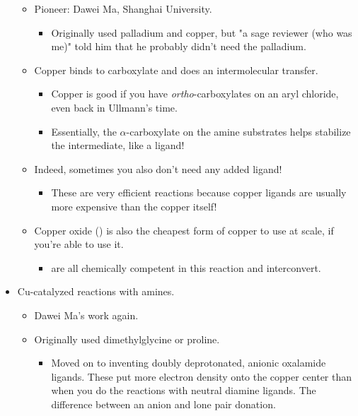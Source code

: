 \documentclass[../notes.tex]{subfiles}
\begin{document}
\begin{itemize}
    \begin{itemize}
        \item Pioneer: Dawei Ma, Shanghai University.
        \begin{itemize}
            \item Originally used palladium and copper, but "a sage reviewer (who was me)" told him that he probably didn't need the palladium.
        \end{itemize}
        \item Copper binds to carboxylate and does an intermolecular transfer.
        \begin{itemize}
            \item Copper is good if you have \emph{ortho}-carboxylates on an aryl chloride, even back in Ullmann's time.
            \item Essentially, the $\alpha$-carboxylate on the amine substrates helps stabilize the intermediate, like a ligand!
        \end{itemize}
        \item Indeed, sometimes you also don't need any added ligand!
        \begin{itemize}
            \item These are very efficient reactions because copper ligands are usually more expensive than the copper itself!
        \end{itemize}
        \item Copper oxide () is also the cheapest form of copper to use at scale, if you're able to use it.
        \begin{itemize}
            \item {} are all chemically competent in this reaction and interconvert.
        \end{itemize}
    \end{itemize}
    \item Cu-catalyzed  reactions with amines.
    \begin{itemize}
        \item Dawei Ma's work again.
        \item Originally used dimethylglycine or proline.
        \begin{itemize}
            \item Moved on to inventing doubly deprotonated, anionic oxalamide ligands. These put more electron density onto the copper center than when you do the reactions with neutral diamine ligands. The difference between an anion and lone pair donation.

\end{itemize}
\end{itemize}
\end{itemize}
\end{document}
